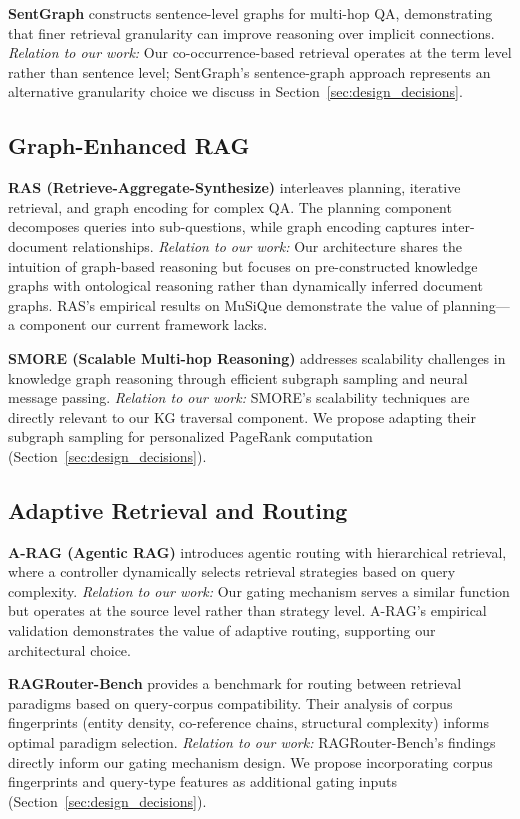 \documentclass[11pt,a4paper]{article}
\begin{document}
\textbf{SentGraph} \citep{sentgraph2024} constructs sentence-level graphs for multi-hop QA, demonstrating that finer retrieval granularity can improve reasoning over implicit connections. \textit{Relation to our work:} Our co-occurrence-based retrieval operates at the term level rather than sentence level; SentGraph's sentence-graph approach represents an alternative granularity choice we discuss in Section~\ref{sec:design_decisions}.

\subsection{Graph-Enhanced RAG}

\textbf{RAS (Retrieve-Aggregate-Synthesize)} \citep{ras2024} interleaves planning, iterative retrieval, and graph encoding for complex QA. The planning component decomposes queries into sub-questions, while graph encoding captures inter-document relationships. \textit{Relation to our work:} Our architecture shares the intuition of graph-based reasoning but focuses on pre-constructed knowledge graphs with ontological reasoning rather than dynamically inferred document graphs. RAS's empirical results on MuSiQue demonstrate the value of planning---a component our current framework lacks.

\textbf{SMORE (Scalable Multi-hop Reasoning)} \citep{smore2023} addresses scalability challenges in knowledge graph reasoning through efficient subgraph sampling and neural message passing. \textit{Relation to our work:} SMORE's scalability techniques are directly relevant to our KG traversal component. We propose adapting their subgraph sampling for personalized PageRank computation (Section~\ref{sec:design_decisions}).

\subsection{Adaptive Retrieval and Routing}

\textbf{A-RAG (Agentic RAG)} \citep{arag2024} introduces agentic routing with hierarchical retrieval, where a controller dynamically selects retrieval strategies based on query complexity. \textit{Relation to our work:} Our gating mechanism serves a similar function but operates at the source level rather than strategy level. A-RAG's empirical validation demonstrates the value of adaptive routing, supporting our architectural choice.

\textbf{RAGRouter-Bench} \citep{ragrouter2024} provides a benchmark for routing between retrieval paradigms based on query-corpus compatibility. Their analysis of corpus fingerprints (entity density, co-reference chains, structural complexity) informs optimal paradigm selection. \textit{Relation to our work:} RAGRouter-Bench's findings directly inform our gating mechanism design. We propose incorporating corpus fingerprints and query-type features as additional gating inputs (Section~\ref{sec:design_decisions}).
\end{document}
